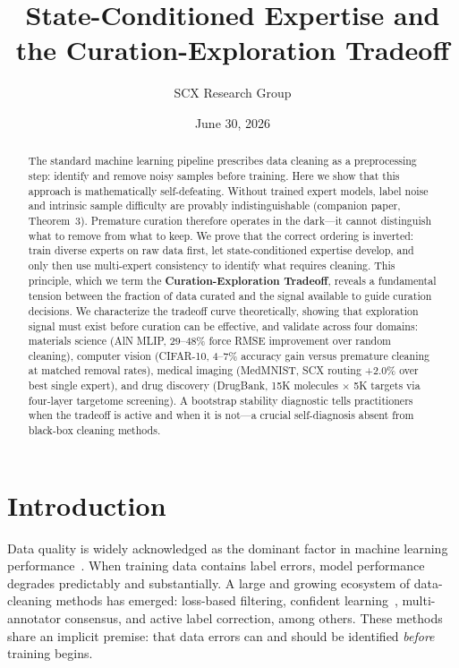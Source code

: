\documentclass[12pt,a4paper]{article}
\title{State-Conditioned Expertise and the Curation-Exploration Tradeoff}
\author{SCX Research Group}
\date{June 30, 2026}
\begin{document}
\maketitle

\begin{abstract}
The standard machine learning pipeline prescribes data cleaning as a preprocessing step: identify and remove noisy samples before training. Here we show that this approach is mathematically self-defeating. Without trained expert models, label noise and intrinsic sample difficulty are provably indistinguishable (companion paper, Theorem~3). Premature curation therefore operates in the dark---it cannot distinguish what to remove from what to keep. We prove that the correct ordering is inverted: train diverse experts on raw data first, let state-conditioned expertise develop, and only then use multi-expert consistency to identify what requires cleaning. This principle, which we term the \textbf{Curation-Exploration Tradeoff}, reveals a fundamental tension between the fraction of data curated and the signal available to guide curation decisions. We characterize the tradeoff curve theoretically, showing that exploration signal must exist before curation can be effective, and validate across four domains: materials science (AlN MLIP, 29--48\% force RMSE improvement over random cleaning), computer vision (CIFAR-10, 4--7\% accuracy gain versus premature cleaning at matched removal rates), medical imaging (MedMNIST, SCX routing +2.0\% over best single expert), and drug discovery (DrugBank, 15K molecules $\times$ 5K targets via four-layer targetome screening). A bootstrap stability diagnostic tells practitioners when the tradeoff is active and when it is not---a crucial self-diagnosis absent from black-box cleaning methods.
\end{abstract}

\section{Introduction}

Data quality is widely acknowledged as the dominant factor in machine learning performance~\cite{sambasivan2021}. When training data contains label errors, model performance degrades predictably and substantially. A large and growing ecosystem of data-cleaning methods has emerged: loss-based filtering, confident learning~\cite{northcutt2021}, multi-annotator consensus, and active label correction, among others. These methods share an implicit premise: that data errors can and should be identified \emph{before} training begins.
\end{document}
